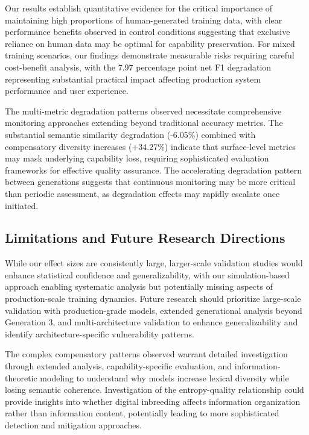 \documentclass{article}
\begin{document}
Our results establish quantitative evidence for the critical importance of maintaining high proportions of human-generated training data, with clear performance benefits observed in control conditions suggesting that exclusive reliance on human data may be optimal for capability preservation. For mixed training scenarios, our findings demonstrate measurable risks requiring careful cost-benefit analysis, with the 7.97 percentage point net F1 degradation representing substantial practical impact affecting production system performance and user experience.

The multi-metric degradation patterns observed necessitate comprehensive monitoring approaches extending beyond traditional accuracy metrics. The substantial semantic similarity degradation (-6.05\%) combined with compensatory diversity increases (+34.27\%) indicate that surface-level metrics may mask underlying capability loss, requiring sophisticated evaluation frameworks for effective quality assurance. The accelerating degradation pattern between generations suggests that continuous monitoring may be more critical than periodic assessment, as degradation effects may rapidly escalate once initiated.

\subsection{Limitations and Future Research Directions}

While our effect sizes are consistently large, larger-scale validation studies would enhance statistical confidence and generalizability, with our simulation-based approach enabling systematic analysis but potentially missing aspects of production-scale training dynamics. Future research should prioritize large-scale validation with production-grade models, extended generational analysis beyond Generation 3, and multi-architecture validation to enhance generalizability and identify architecture-specific vulnerability patterns.

The complex compensatory patterns observed warrant detailed investigation through extended analysis, capability-specific evaluation, and information-theoretic modeling to understand why models increase lexical diversity while losing semantic coherence. Investigation of the entropy-quality relationship could provide insights into whether digital inbreeding affects information organization rather than information content, potentially leading to more sophisticated detection and mitigation approaches.
\end{document}

